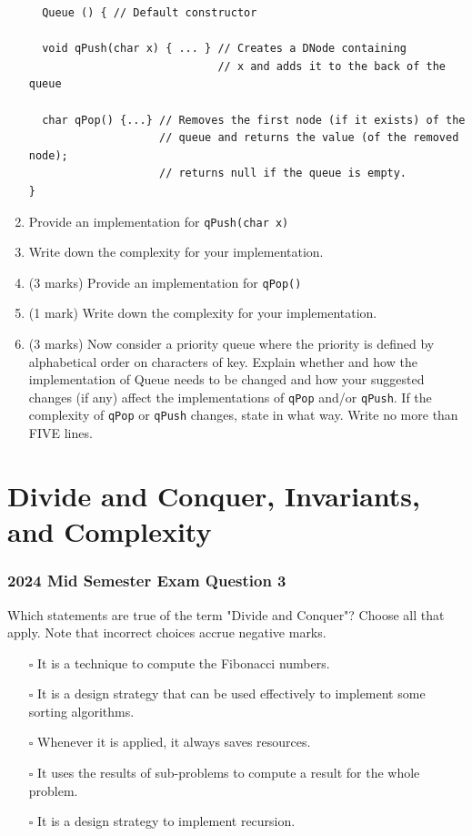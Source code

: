 \documentclass[twoside=false,DIV=14]{scrartcl}
\begin{document}
\begin{enumerate}
{\begin{lstlisting}
  Queue () { // Default constructor

  void qPush(char x) { ... } // Creates a DNode containing
                             // x and adds it to the back of the queue

  char qPop() {...} // Removes the first node (if it exists) of the
                    // queue and returns the value (of the removed node);
                    // returns null if the queue is empty.
}
\end{lstlisting}}
\item Provide an implementation for \verb+qPush(char x)+
\item Write down the complexity for your implementation.
\item (3 marks) Provide an implementation for \verb+qPop()+
\item (1 mark) Write down the complexity for your implementation.
\item (3 marks) Now consider a priority queue where the priority is defined by alphabetical order on characters of key. Explain whether and how the implementation of Queue needs to be changed and how your suggested changes (if any) affect the implementations of \verb+qPop+ and/or \verb+qPush+. If the complexity of \verb+qPop+ or \verb+qPush+ changes, state in what way. Write no more than FIVE lines.
\end{enumerate}

 

\newpage\setcounter{section}{0}
\part*{Divide and Conquer, Invariants, and Complexity}

\section{2024 Mid Semester Exam Question 3}
Which statements are true of the term "Divide and Conquer"?  Choose all that apply.  Note that incorrect choices accrue negative marks.
\begin{enumerate}
\item[$\square$] It is a technique to compute the Fibonacci numbers.
\item[$\square$] It is a design strategy that can be used effectively to implement some sorting algorithms.
\item[$\square$] Whenever it is applied, it always saves resources.
\item[$\square$] It uses the results of sub-problems to compute a result for the whole problem.
\item[$\square$] It is a design strategy to implement recursion.
\end{enumerate}
\end{document}
